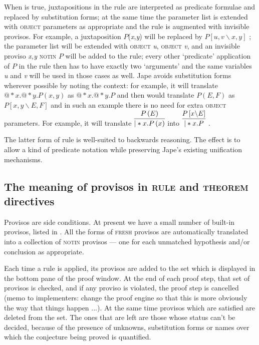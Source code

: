 When  is true, juxtapositions in the rule are interpreted as predicate formulae and replaced by substitution forms; at the same time the parameter list is extended with \textsc{object} parameters as appropriate and the rule is augmented with invisible provisos. For example, a juxtaposition $P$(\textit{x},\textit{y}) will be replaced by $P\left[ u,v\backslash x,y\right] $ ; the parameter list will be extended with \textsc{object} \textit{u}, \textsc{object} \textit{v}, and an invisible proviso \textit{x,y} \textsc{notin} $P$ will be added to the rule; every other `predicate' application of $P$ in the rule then has to have exactly two `arguments' and the same variables \textit{u} and \textit{v} will be used in those cases as well. Jape avoids substitution forms wherever possible by noting the context: for example, it will translate $@*x.@*y.P\left( x,y\right) $ as $@*x.@*y.P$ and then would translate $P\left( E,F\right) $ as $P\left[ x,y\backslash E,F\right] $ and in such an example there is no need for extra \textsc{object} parameters. For example, it will translate $\infer{|*x.P\left( x\right) }
       {P\left( E\right) }$ into $\infer{|*x.P}
       {P\left[ x\backslash E\right] }$ .

The latter form of rule is well-suited to backwards reasoning. The effect is to allow a kind of predicate notation while preserving Jape's existing unification mechanisms.

\subsection{The meaning of provisos in \textsc{rule} and \textsc{theorem} directives}

Provisos are side conditions. At present we have a small number of built-in provisos, listed in . All the forms of \textsc{fresh} provisos are automatically translated into a collection of \textsc{notin} provisos --- one for each unmatched hypothesis and/or conclusion as appropriate.

Each time a rule is applied, its provisos are added to the set which is displayed in the bottom pane of the proof window. At the end of each proof step, that set of provisos is checked, and if any proviso is violated, the proof step is cancelled (memo to implementers: change the proof engine so that this is more obviously the way that things happen ...). At the same time provisos which are satisfied are deleted from the set. The ones that are left are those whose status can't be decided, because of the presence of unknowns, substitution forms or names over which the conjecture being proved is quantified.

